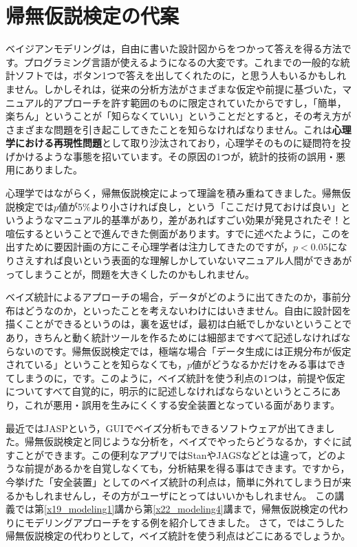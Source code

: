 \documentclass{ltjsbook}
\begin{document}
\section{帰無仮説検定の代案}
ベイジアンモデリングは，自由に書いた設計図からをつかって答えを得る方法です。プログラミング言語が使えるようになるの大変です。これまでの一般的な統計ソフトでは，ボタン1つで答えを出してくれたのに，と思う人もいるかもしれません。しかしそれは，従来の分析方法がさまざまな仮定や前提に基づいた，マニュアル的アプローチを許す範囲のものに限定されていたからですし，「簡単，楽ちん」ということが「知らなくていい」ということだとすると，その考え方がさまざまな問題を引き起こしてきたことを知らなければなりません。これは\textbf{心理学における再現性問題}\textcite{Ikeda2016}として取り沙汰されており，心理学そのものに疑問符を投げかけるような事態を招いています。その原因の1つが，統計的技術の誤用・悪用にありました。

心理学ではながらく，帰無仮説検定によって理論を積み重ねてきました。帰無仮説検定では$p$値が5\%より小さければ良し，という「ここだけ見ておけば良い」というようなマニュアル的基準があり，差があればすごい効果が発見されたぞ！と喧伝するということで進んできた側面があります。すでに述べたように，このを出すために要因計画の方にこそ心理学者は注力してきたのですが，$p<0.05$になりさえすれば良いという表面的な理解しかしていないマニュアル人間ができあがってしまうことが，問題を大きくしたのかもしれません。

ベイズ統計によるアプローチの場合，データがどのように出てきたのか，事前分布はどうなのか，といったことを考えないわけにはいきません。自由に設計図を描くことができるというのは，裏を返せば，最初は白紙でしかないということであり，きちんと動く統計ツールを作るためには細部まですべて記述しなければならないのです。帰無仮説検定では，極端な場合「データ生成には正規分布が仮定されている」ということを知らなくても，$p$値がどうなるかだけをみる事はできてしまうのに，です。このように，ベイズ統計を使う利点の1つは，前提や仮定についてすべて自覚的に，明示的に記述しなければならないというところにあり，これが悪用・誤用を生みにくくする安全装置となっている面があります。

最近ではJASP\textcite{JASP2021}という，GUIでベイズ分析もできるソフトウェアが出てきました。帰無仮説検定と同じような分析を，ベイズでやったらどうなるか，すぐに試すことができます。この便利なアプリではStanやJAGSなどとは違って，どのような前提があるかを自覚しなくても，分析結果を得る事はできます。ですから，今挙げた「安全装置」としてのベイズ統計の利点は，簡単に外れてしまう日が来るかもしれませんし，その方がユーザにとってはいいかもしれません。
この講義では第\ref{x19_modeling1}講から第\ref{x22_modeling4}講まで，帰無仮説検定の代わりにモデリングアプローチをする例を紹介してきました。
さて，ではこうした帰無仮説検定の代わりとして，ベイズ統計を使う利点はどこにあるでしょうか。
\end{document}

